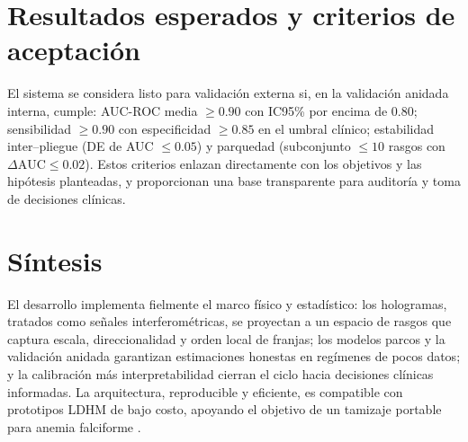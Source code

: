\section*{Resultados esperados y criterios de aceptación}
El sistema se considera listo para validación externa si, en la validación anidada interna, cumple: AUC-ROC media $\ge 0.90$ con IC95\% por encima de 0.80; sensibilidad $\ge 0.90$ con especificidad $\ge 0.85$ en el umbral clínico; estabilidad inter–pliegue (DE de AUC $\le 0.05$) y parquedad (subconjunto $\le 10$ rasgos con $\Delta\text{AUC}\le 0.02$). Estos criterios enlazan directamente con los objetivos y las hipótesis planteadas, y proporcionan una base transparente para auditoría y toma de decisiones clínicas.

\section*{Síntesis}
El desarrollo implementa fielmente el marco físico y estadístico: los hologramas, tratados como señales interferométricas, se proyectan a un espacio de rasgos que captura escala, direccionalidad y orden local de franjas; los modelos parcos y la validación anidada garantizan estimaciones honestas en regímenes de pocos datos; y la calibración más interpretabilidad cierran el ciclo hacia decisiones clínicas informadas. La arquitectura, reproducible y eficiente, es compatible con prototipos LDHM de bajo costo, apoyando el objetivo de un tamizaje portable para anemia falciforme \cite{Amann2019SciRep,BuitragoDuque2023HardwareX,Greenbaum2014STM,Chen2022Photonics,Kiani2022TextureSurvey,Zhou2019MedImageContrast,Tsamardinos2022Patterns,Alzubaidi2020Electronics}.
